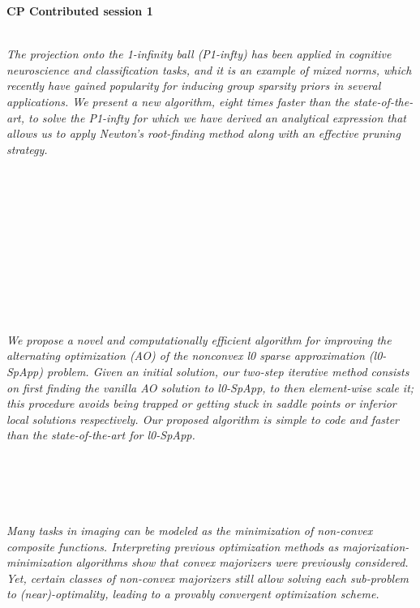   \noindent\textbf{CP Contributed session 1}\\
  \textit{} \\
    
  \begin{multicols}{2}
      \textit{The projection onto the 1-infinity ball (P1-infty) has been applied in
cognitive neuroscience and classification tasks, and it is an example
of mixed norms, which recently have gained popularity for inducing
group sparsity priors in several applications. We present a new
algorithm, eight times faster than the state-of-the-art, to solve the
P1-infty for which we have derived an analytical expression that
allows us to apply Newton’s root-finding method along with an
effective pruning strategy.}\\
\\ 
        \\
        \\\\
        \\
        \\\\
        \\
        \\\\
\\
      \textit{We propose a novel and computationally efficient algorithm for improving the alternating optimization (AO) of the nonconvex l0 sparse approximation (l0-SpApp) problem. Given an initial solution, our two-step iterative method consists on first finding the vanilla AO solution to l0-SpApp, to then element-wise scale it; this procedure avoids being trapped or getting stuck in saddle points or inferior local solutions respectively. Our proposed algorithm is simple to code and faster than the state-of-the-art for l0-SpApp.}\\
\\ 
        \\
        \\\\
\\
      \textit{Many tasks in imaging can be modeled as the minimization of non-convex composite functions. Interpreting previous optimization methods as majorization-minimization algorithms show that convex majorizers were previously considered. Yet, certain classes of non-convex majorizers still allow solving each sub-problem to (near)-optimality, leading to a provably convergent optimization scheme.
}
\end{multicols}

